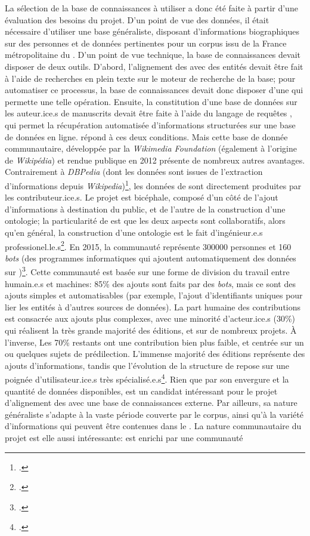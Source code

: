 La sélection de la base de connaissances à utiliser a donc été faite à partir d'une évaluation des besoins du projet. D'un point de vue des données, il était nécessaire d'utiliser une base généraliste, disposant d'informations biographiques sur des personnes et de données pertinentes pour un corpus issu de la France métropolitaine du . D'un point de vue technique, la base de connaissances devait disposer de deux outils. D'abord, l'alignement des \tname{} avec des entités \wkd{} devait être fait à l'aide de recherches en plein texte sur le moteur de recherche de la base; pour automatiser ce processus, la base de connaissances devait donc disposer d'une \api{} qui permette une telle opération. Ensuite, la constitution d'une base de données sur les auteur.ice.s de manuscrits devait être faite à l'aide du langage de requêtes \sparql{}, qui permet la récupération automatisée d'informations structurées sur une base de données en ligne. \wkd{} répond à ces deux conditions. Mais cette base de donnée communautaire, développée par la \textit{Wikimedia Foundation} (également à l'origine de \textit{Wikipédia}) et rendue publique en 2012 présente de nombreux autres avantages. Contrairement à \textit{DBPedia} (dont les données sont issues de l'extraction d'informations depuis \textit{Wikipedia})\footcite[p. 1]{muller-birn_peer-production_2015}, les données de \wkd{} sont directement produites par les contributeur.ice.s. Le projet est bicéphale, composé d'un côté de l'ajout d'informations à destination du public, et de l'autre de la construction d'une \gls{ontologie}; la particularité de \wkd{} est que les deux aspects sont collaboratifs, alors qu'en général, la construction d'une ontologie est le fait d'ingénieur.e.s professionel.le.s\footcite[p. 2-3]{muller-birn_peer-production_2015}. En 2015, la communauté \wkd{} représente 300000 personnes et 160 \textit{bots} (des programmes informatiques qui ajoutent automatiquement des données sur \wkd{})\footcite[p. 4]{muller-birn_peer-production_2015}. Cette communauté est basée sur une forme de division du travail entre humain.e.s et machines: 85\% des ajouts sont faits par des \textit{bots}, mais ce sont des ajouts simples et automatisables (par exemple, l'ajout d'identifiants uniques pour lier les entités à d'autres sources de données). La part humaine des contributions est consacrée aux ajouts plus complexes, avec une minorité d'acteur.ice.s (30\%) qui réalisent la très grande majorité des éditions, et sur de nombreux projets. À l'inverse, Les 70\% restants ont une contribution bien plus faible, et centrée sur un ou quelques sujets de prédilection. L'immense majorité des éditions représente des ajouts d'informations, tandis que l'évolution de la structure de \wkd{} repose sur une poignée d'utilisateur.ice.s très spécialisé.e.s\footcite[p. 4, 8-9]{muller-birn_peer-production_2015}. Rien que par son envergure et la quantité de données disponibles, \wkd{} est un candidat intéressant pour le projet d'alignement des \tname{} avec une base de connaissances externe. Par ailleurs, sa nature généraliste s'adapte à la vaste période couverte par le corpus, ainsi qu'à la variété d'informations qui peuvent être contenues dans le \tname{}. La nature communautaire du projet est elle aussi intéressante: \wkd{} est enrichi par une communauté 